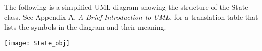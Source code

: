 

The following is a simplified UML diagram showing the structure of the
State class.  See Appendix A, {\it A Brief Introduction to UML},
for a translation table that lists the symbols in the diagram and their 
meaning.

\begin{center}
\texttt{[image: State\_obj]}   
\end{center}
